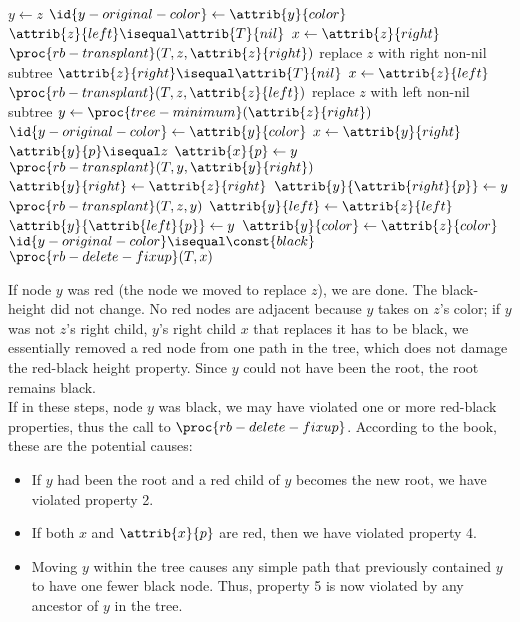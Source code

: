 \documentclass[12pt]{article}
\begin{document}
\begin{codebox}
\li $y \gets{z}$
\li $\id{y-original-color} \gets{\attrib{y}{color}}$
\li \If $\attrib{z}{left} \isequal \attrib{T}{nil}$
\li \Then
        $x \gets{\attrib{z}{right}}$
\li     $\proc{rb-transplant}(T, z, \attrib{z}{right})$ \Comment replace $z$ with right non-nil subtree
\li \ElseIf $\attrib{z}{right} \isequal \attrib{T}{nil}$
\li \Then
        $x \gets{\attrib{z}{left}}$
\li     $\proc{rb-transplant}(T, z, \attrib{z}{left})$ \Comment replace $z$ with left non-nil subtree
\li \Else
\li     $y \gets{\proc{tree-minimum}(\attrib{z}{right})}$
\li     $\id{y-original-color} \gets{\attrib{y}{color}}$
\li     $x \gets{\attrib{y}{right}}$
\li     \If $\attrib{y}{p} \isequal z$
\li     \Then
            $\attrib{x}{p} \gets{y}$
\li     \Else
            $\proc{rb-transplant}(T, y, \attrib{y}{right})$
\li         $\attrib{y}{right} \gets{\attrib{z}{right}}$
\li         $\attrib{y}{\attrib{right}{p}} \gets{y}$
        \End
\li     $\proc{rb-transplant}(T, z, y)$
\li     $\attrib{y}{left} \gets{\attrib{z}{left}}$
\li     $\attrib{y}{\attrib{left}{p}} \gets{y}$
\li     $\attrib{y}{color} \gets{\attrib{z}{color}}$
    \End
\li \If $\id{y-original-color} \isequal \const{black}$
\li \Then
        $\proc{rb-delete-fixup}(T, x)$
    \End
\end{codebox}

If node $y$ was red (the node we moved to replace $z$), we are done. The black-height did not change. No red nodes are adjacent because $y$ takes on $z$'s color; if $y$ was not $z$'s right child, $y$'s right child $x$ that replaces it has to be black, we essentially removed a red node from one path in the tree, which does not damage the red-black height property. Since $y$ could not have been the root, the root remains black.
\\
If in these steps, node $y$ was black, we may have violated one or more red-black properties, thus the call to $\proc{rb-delete-fixup}$. According to the book, these are the potential causes:

\begin{itemize}
    \item If $y$ had been the root and a red child of $y$ becomes the new root, we have violated property 2.
    \item If both $x$ and $\attrib{x}{p}$ are red, then we have violated property 4.
    \item Moving $y$ within the tree causes any simple path that previously contained $y$ to have one fewer black node. Thus, property 5 is now violated by any ancestor of $y$ in the tree.
\end{itemize}
\end{document}
